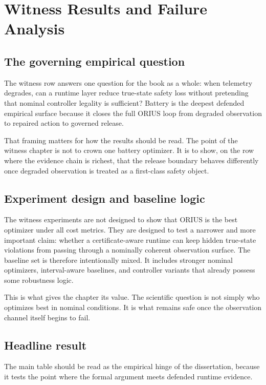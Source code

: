 \chapter{Witness Results and Failure Analysis}
\label{ch:witness-results-failure-analysis}

\section{The governing empirical question}
The witness row answers one question for the book as a whole: when telemetry degrades, can a
runtime layer reduce true-state safety loss without pretending that nominal controller
legality is sufficient? Battery is the deepest defended empirical surface because it closes
the full ORIUS loop from degraded observation to repaired action to governed release.

That framing matters for how the results should be read. The point of the witness chapter is
not to crown one battery optimizer. It is to show, on the row where the evidence chain is
richest, that the release boundary behaves differently once degraded observation is treated as
a first-class safety object.

\section{Experiment design and baseline logic}
The witness experiments are not designed to show that ORIUS is the best optimizer under all
cost metrics. They are designed to test a narrower and more important claim: whether a
certificate-aware runtime can keep hidden true-state violations from passing through a
nominally coherent observation surface. The baseline set is therefore intentionally mixed.
It includes stronger nominal optimizers, interval-aware baselines, and controller variants
that already possess some robustness logic.

This is what gives the chapter its value. The scientific question is not simply who
optimizes best in nominal conditions. It is what remains safe once the observation channel
itself begins to fail.

\section{Headline result}
The main table should be read as the empirical hinge of the dissertation, because it tests
the point where the formal argument meets defended runtime evidence.

